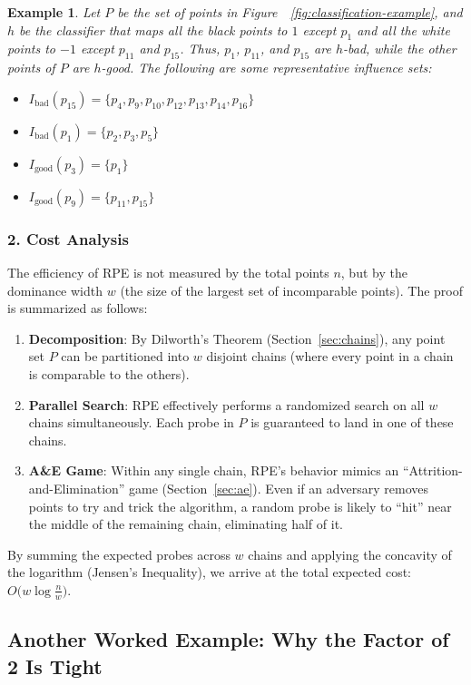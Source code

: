 \documentclass[11pt, a4paper]{article}
\theoremstyle{boxed}
\newtheorem{innerexample}{Example}[section]
\newenvironment{example}
  {\begin{mdframed}[style=thmstyle]\begin{innerexample}}
  {\end{innerexample}\end{mdframed}}
\begin{document}
\begin{example}
  Let $P$ be the set of points in Figure~~\ref{fig:classification-example}, and $h$ be the classifier that maps all the black points to $1$ except $p_1$ and all the white points to $-1$ except $p_{11}$ and $p_{15}$. Thus, $p_1$, $p_{11}$, and $p_{15}$ are $h$-bad, while the other points of $P$ are $h$-good. The following are some representative influence sets:
\begin{itemize}
    \item $I_{\text{bad}}(p_{15}) = \{p_4, p_9, p_{10}, p_{12}, p_{13}, p_{14}, p_{16}\}$
    \item $I_{\text{bad}}(p_1) = \{p_2, p_3, p_5\}$
    \item $I_{\text{good}}(p_3) = \{p_1\}$
    \item $I_{\text{good}}(p_9) = \{p_{11}, p_{15}\}$
\end{itemize}
\end{example}

\subsubsection*{2. Cost Analysis} 
The efficiency of RPE is not measured by the total points $n$, but by the dominance width $w$ (the size of the largest set of incomparable points). The proof is summarized as follows:
\begin{enumerate}
  \item \textbf{Decomposition}: By Dilworth’s Theorem (Section~\ref{sec:chains}), any point set $P$ can be partitioned into $w$ disjoint chains (where every point in a chain is comparable to the others).
  \item \textbf{Parallel Search}: RPE effectively performs a randomized search on all $w$ chains simultaneously. Each probe in $P$ is guaranteed to land in one of these chains.
  \item \textbf{A\&E Game}: Within any single chain, RPE's behavior mimics an ``Attrition-and-Elimination'' game (Section~\ref{sec:ae}). Even if an adversary removes points to try and trick the algorithm, a random probe is likely to ``hit'' near the middle of the remaining chain, eliminating half of it.
\end{enumerate}
By summing the expected probes across $w$ chains and applying the concavity of the logarithm (Jensen's Inequality), we arrive at the total expected cost: $O\bigl(w \log \frac{n}{w}\bigr)$.

\subsection{Another Worked Example: Why the Factor of 2 Is Tight}
\end{document}
